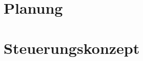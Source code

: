 \documentclass[
  a4paper,
  oneside,
  11pt,
  headsepline,
  bibliography=totoc,
  listof=totoc,   %
  final
]
{scrbook}
\begin{document}
\frontmatter

\setcounter{tocdepth}{1}
\tableofcontents
\listoffigures
\printnomenclature%

\mainmatter{}


%

\chapter{Planung}
\label{chap:planning}












\appendix
\chapter{Steuerungskonzept}
\label{appndx:controlConcept}
% 
\end{document}
